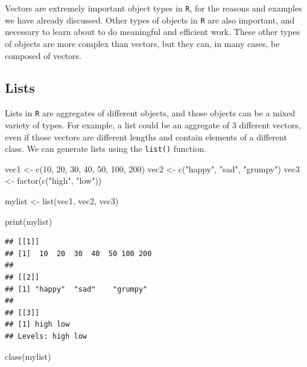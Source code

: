 \documentclass[
]{book}
\newenvironment{Shaded}{\begin{snugshade}}{\end{snugshade}}
\newcommand{\DecValTok}[1]{\textcolor[rgb]{0.00,0.00,0.81}{#1}}
\newcommand{\FunctionTok}[1]{\textcolor[rgb]{0.00,0.00,0.00}{#1}}
\newcommand{\NormalTok}[1]{#1}
\newcommand{\OtherTok}[1]{\textcolor[rgb]{0.56,0.35,0.01}{#1}}
\newcommand{\StringTok}[1]{\textcolor[rgb]{0.31,0.60,0.02}{#1}}
\begin{document}
Vectors are extremely important object types in \texttt{R}, for the reasons and examples we have already discussed. Other types of objects in \texttt{R} are also important, and necessary to learn about to do meaningful and efficient work. These other types of objects are more complex than vectors, but they can, in many cases, be composed of vectors.

\hypertarget{lists}{%
\subsection{Lists}\label{lists}}

Lists in \texttt{R} are aggregates of different objects, and those objects can be a mixed variety of types. For example, a list could be an aggregate of 3 different vectors, even if those vectors are different lengths and contain elements of a different class. We can generate lists using the \texttt{list()} function.

\begin{Shaded}
\begin{Highlighting}[]
\NormalTok{vec1 }\OtherTok{\textless{}{-}} \FunctionTok{c}\NormalTok{(}\DecValTok{10}\NormalTok{, }\DecValTok{20}\NormalTok{, }\DecValTok{30}\NormalTok{, }\DecValTok{40}\NormalTok{, }\DecValTok{50}\NormalTok{, }\DecValTok{100}\NormalTok{, }\DecValTok{200}\NormalTok{)}
\NormalTok{vec2 }\OtherTok{\textless{}{-}} \FunctionTok{c}\NormalTok{(}\StringTok{"happy"}\NormalTok{, }\StringTok{"sad"}\NormalTok{, }\StringTok{"grumpy"}\NormalTok{)}
\NormalTok{vec3 }\OtherTok{\textless{}{-}} \FunctionTok{factor}\NormalTok{(}\FunctionTok{c}\NormalTok{(}\StringTok{"high"}\NormalTok{, }\StringTok{"low"}\NormalTok{))}

\NormalTok{mylist }\OtherTok{\textless{}{-}} \FunctionTok{list}\NormalTok{(vec1, vec2, vec3)}

\FunctionTok{print}\NormalTok{(mylist)}
\end{Highlighting}
\end{Shaded}

\begin{verbatim}
## [[1]]
## [1]  10  20  30  40  50 100 200
## 
## [[2]]
## [1] "happy"  "sad"    "grumpy"
## 
## [[3]]
## [1] high low 
## Levels: high low
\end{verbatim}

\begin{Shaded}
\begin{Highlighting}[]
\FunctionTok{class}\NormalTok{(mylist)}
\end{Highlighting}
\end{Shaded}
\end{document}
